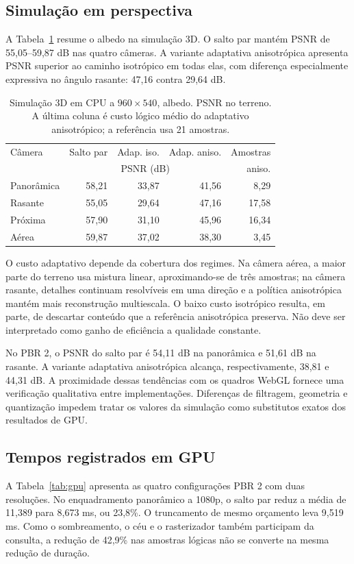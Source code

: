 \subsection{Simulação em perspectiva}
A Tabela~\ref{tab:cpu3d} resume o albedo na simulação 3D. O salto par mantém PSNR de 55,05--59,87 dB nas quatro câmeras. A variante adaptativa anisotrópica apresenta PSNR superior ao caminho isotrópico em todas elas, com diferença especialmente expressiva no ângulo rasante: 47,16 contra 29,64 dB.
\begin{table}[t]
\centering\scriptsize\setlength{\tabcolsep}{4pt}
\caption{Simulação 3D em CPU a $960\times540$, albedo. PSNR no terreno. A última coluna é custo lógico médio do adaptativo anisotrópico; a referência usa 21 amostras.}
\label{tab:cpu3d}
\begin{tabular}{lrrrr}\toprule
Câmera & Salto par & Adap. iso. & Adap. aniso. & Amostras\\
 & \multicolumn{3}{c}{PSNR (dB)} & aniso.\\\midrule
Panorâmica & 58,21 & 33,87 & 41,56 & 8,29\\
Rasante & 55,05 & 29,64 & 47,16 & 17,58\\
Próxima & 57,90 & 31,10 & 45,96 & 16,34\\
Aérea & 59,87 & 37,02 & 38,30 & 3,45\\\bottomrule
\end{tabular}
\end{table}

O custo adaptativo depende da cobertura dos regimes. Na câmera aérea, a maior parte do terreno usa mistura linear, aproximando-se de três amostras; na câmera rasante, detalhes continuam resolvíveis em uma direção e a política anisotrópica mantém mais reconstrução multiescala. O baixo custo isotrópico resulta, em parte, de descartar conteúdo que a referência anisotrópica preserva. Não deve ser interpretado como ganho de eficiência a qualidade constante.

No PBR 2, o PSNR do salto par é 54,11 dB na panorâmica e 51,61 dB na rasante. A variante adaptativa anisotrópica alcança, respectivamente, 38,81 e 44,31 dB. A proximidade dessas tendências com os quadros WebGL fornece uma verificação qualitativa entre implementações. Diferenças de filtragem, geometria e quantização impedem tratar os valores da simulação como substitutos exatos dos resultados de GPU.

\subsection{Tempos registrados em GPU}
A Tabela~\ref{tab:gpu} apresenta as quatro configurações PBR 2 com duas resoluções. No enquadramento panorâmico a 1080p, o salto par reduz a média de 11,389 para 8,673 ms, ou 23,8\%. O truncamento de mesmo orçamento leva 9,519 ms. Como o sombreamento, o céu e o rasterizador também participam da consulta, a redução de 42,9\% nas amostras lógicas não se converte na mesma redução de duração.

